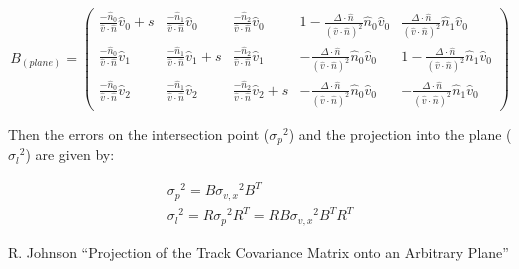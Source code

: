 \documentclass[fleqn,twoside,draft]{article}
\begin{document}
\begin{equation}
  B_{(plane)} = 
\begin{pmatrix}
  \frac{- \hat{n}_0}{\hat{v}\cdot\hat{n}}\hat{v}_0 + s &
  \frac{- \hat{n}_1}{\hat{v}\cdot\hat{n}}\hat{v}_0 &
  \frac{- \hat{n}_2}{\hat{v}\cdot\hat{n}}\hat{v}_0 &
  1 - \frac{\Delta\cdot\hat{n}}{(\hat{v}\cdot\hat{n})^2}\hat{n}_0\hat{v}_0 &
  \frac{\Delta\cdot\hat{n}}{(\hat{v}\cdot\hat{n})^2}\hat{n}_1\hat{v}_0 \\
  \frac{- \hat{n}_0}{\hat{v}\cdot\hat{n}}\hat{v}_1 &
  \frac{- \hat{n}_1}{\hat{v}\cdot\hat{n}}\hat{v}_1 + s &
  \frac{- \hat{n}_2}{\hat{v}\cdot\hat{n}}\hat{v}_1 &
  - \frac{\Delta\cdot\hat{n}}{(\hat{v}\cdot\hat{n})^2}\hat{n}_0\hat{v}_0 &
  1 - \frac{\Delta\cdot\hat{n}}{(\hat{v}\cdot\hat{n})^2}\hat{n}_1\hat{v}_0 \\
  \frac{- \hat{n}_0}{\hat{v}\cdot\hat{n}}\hat{v}_2 &
  \frac{- \hat{n}_1}{\hat{v}\cdot\hat{n}}\hat{v}_2 &
  \frac{- \hat{n}_2}{\hat{v}\cdot\hat{n}}\hat{v}_2 + s&
  - \frac{\Delta\cdot\hat{n}}{(\hat{v}\cdot\hat{n})^2}\hat{n}_0\hat{v}_0 &
  - \frac{\Delta\cdot\hat{n}}{(\hat{v}\cdot\hat{n})^2}\hat{n}_1\hat{v}_0   
\end{pmatrix}
\end{equation}

Then the errors on the intersection point (${\sigma_{p}}^2$) and the projection into the plane (${\sigma_{l}}^2$) are given by:

\begin{subequations}
\begin{gather}
  {\sigma_{p}}^2 =  B {\sigma_{v,x}}^2 B^T \\
  {\sigma_{l}}^2 =  R {\sigma_{p}}^2 R^T = R B {\sigma_{v,x}}^2 B^T R^T
\end{gather}
\end{subequations}

\clearpage

%
%
%

%
%
\appendix


\clearpage

\begin{thebibliography}{9}

R. Johnson
``Projection of the Track Covariance Matrix onto an Arbitrary Plane''

\end{thebibliography}
\end{document}
